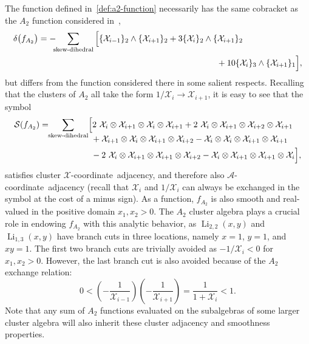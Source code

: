 \documentclass[12pt]{article}
\DeclareMathOperator{\Li}{Li}
\def\x{\mathcal{X}}
\def\xcoord{$\mathcal{X}$-coordinate}
\def\acoord{$\mathcal{A}$-coordinate}
\begin{document}
The function defined in~\eqref{def:a2-function} necessarily has the same cobracket as the $A_2$ function considered in~\cite{Golden:2014xqa},
\begin{align} \label{eq:A2_cobracket}
	\delta\big(f_{A_2}\big) &= -\! \! \! \sum_{\text{skew-dihedral}} \Big[ \{\x_{i-1}\}_2 \wedge \{\x_{i+1}\}_2 + 3\{\x_{i}\}_2 \wedge \{\x_{i+1}\}_2 \\
	&\hspace{7.4cm} + 10\{\x_{i}\}_3 \wedge \{\x_{i+1} \}_1 \Big], \nonumber
\end{align}
but differs from the function considered there in some salient respects. Recalling that the clusters of $A_2$ all take the form $1/\x_i\to \x_{i+1}$, it is easy to see that the symbol
\begin{align}
   {\cal S}(f_{A_2}) = \!\! \sum_{\text{skew-dihedral}} &\Big[ 2 \ \x_{i}\otimes\x_{i+1}\otimes\x_{i}\otimes\x_{i+1} + 2 \ \x_{i}\otimes\x_{i+1}\otimes\x_{i+2}\otimes\x_{i+1} \nonumber \\[-.3cm]
&\ + \x_{i+1}\otimes\x_{i}\otimes\x_{i+1}\otimes\x_{i+2} - \x_{i}\otimes\x_{i}\otimes\x_{i+1}\otimes\x_{i+1}  \\
&\ - 2 \ \x_{i}\otimes\x_{i+1}\otimes\x_{i+1}\otimes\x_{i+2}  - \x_{i}\otimes\x_{i+1}\otimes\x_{i+1}\otimes\x_{i} \Big], \nonumber
\end{align}
satisfies cluster \xcoord\ adjacency, and therefore also \acoord\ adjacency (recall that $\x_i$ and $1/\x_i$ can always be exchanged in the symbol at the cost of a minus sign). As a function, $f_{A_2}$ is also smooth and real-valued in the positive domain $x_1, x_2>0$. The $A_2$ cluster algebra plays a crucial role in endowing $f_{A_2}$ with this analytic behavior, as $\Li_{2,2}(x,y)$ and $\Li_{1,3}(x,y)$ have branch cuts in three locations, namely $x=1$, $y=1$, and $xy=1$. The first two branch cuts are trivially avoided as $-1/\x_i<0$ for $x_1,x_2>0$. However, the last branch cut is also avoided because of the $A_2$ exchange relation: 
\begin{equation}
	0<\left(-\frac{1}{\x_{i-1}}\right)\left(-\frac{1}{\x_{i+1}}\right) = \frac{1}{1+\x_i}<1.
\end{equation}
Note that any sum of $A_2$ functions evaluated on the subalgebras of some larger cluster algebra will also inherit these cluster adjacency and smoothness properties. 
\end{document}
